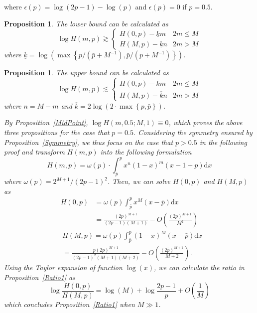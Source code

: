 \documentclass{article}
\makeatletter
\newtheorem{proposition}[theorem]{Proposition}
\renewenvironment{proof}[1][\proofname]{\par
  \vspace{-\topsep}%
  \pushQED{\qed}%
  \normalfont
  \topsep0pt \partopsep0pt %
  \trivlist
  \item[\hskip\labelsep
        \itshape
    #1\@addpunct{.}]\ignorespaces
}{%
  \popQED\endtrivlist\@endpefalse
  \addvspace{0pt plus 0pt} %
}
\makeatother
\begin{document}
where $\epsilon(p)=\log(2p-1)-\log(p)$ and $\epsilon(p)=0$ if $p=0.5$.
\begin{proposition}
\label{LowBound1}
The lower bound can be calculated as
\begin{equation*}
\log H(m,p)\gtrsim \left\{
    \begin{array}{cl}
    H(0,p)- \underline{k}m& 2m\leq M\\
    H(M,p)- \underline{k}n& 2m>M
    \end{array}\right.
\end{equation*}
where $\underline{k}=\log\left(\max\left\{p/(\bar{p}+M^{-1}),\bar{p}/(p+M^{-1})\right\}\right)$.
\end{proposition}
\begin{proposition}
\label{UpBound1}
The upper bound can be calculated as
\begin{equation*}
\log H(m,p)\lesssim \left\{
    \begin{array}{cl}
    H(0,p)- \overline{k}m& 2m\leq M\\
    H(M,p)- \overline{k}n& 2m>M
    \end{array}\right.
\end{equation*}
where $n=M-m$ and $\overline{k}=2\log\left(2\cdot \max\left\{p,\bar{p}\right\}\right)$.
\begin{proof}
By Proposition~\ref{MidPoint}, $\log H(m, 0.5;M,1)\equiv 0$, which proves the above three propositions for the case that $p=0.5$. Considering the symmetry ensured by Proposition~\ref{Symmetry}, we thus focus on the case that $p>0.5$ in the following proof and transform $H(m,p)$ into the following formulation
\begin{equation}
H(m,p)=\omega(p)\cdot \int_{\bar{p}}^{p}x^n(1-x)^m(x-1+p)\mathrm{d}x
\end{equation}
where $\omega(p)=2^{M+1}/(2p-1)^2$. Then, we can solve $H(0,p)$ and $H(M,p)$ as
\begin{equation}
\begin{split}
H(0,p)&=\omega(p)\int_{\bar{p}}^{p}x^M(x-\bar{p})\mathrm{d}x\\
&=\frac{(2p)^{M+1}}{(2p-1)(M+1)} - O\left(\frac{(2p)^{M+1}}{M^2}\right)
\end{split}
\end{equation}
\begin{equation}
\begin{split}
&H(M,p)=\omega(p)\int_{\bar{p}}^{p}(1-x)^M(x-\bar{p})\mathrm{d}x\\
&=\frac{p(2p)^{M+1}}{(2p-1)^2(M+1)(M+2)} - O\left(\frac{(2\bar{p})^{M+1}}{M+2}\right).
\end{split}
\end{equation}
Using the Taylor expansion of function $\log(x)$, we can calculate the ratio in Proposition~\ref{Ratio1} as
\begin{equation}
\log\frac{H(0,p)}{H(M,p)}=\log(M)+\log\frac{2p-1}{p}+O\left(\frac{1}{M}\right)
\end{equation}
which concludes Proposition~\ref{Ratio1} when $M\gg 1$.


\end{proof}
\end{proposition}
\end{document}

